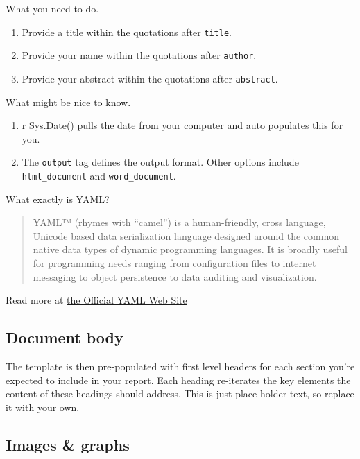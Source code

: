 \documentclass[
]{book}
\providecommand{\tightlist}{%
  \setlength{\itemsep}{0pt}\setlength{\parskip}{0pt}}
\begin{document}
What you need to do.

\begin{enumerate}
\def\labelenumi{\arabic{enumi}.}
\tightlist
\item
  Provide a title within the quotations after \texttt{title}.
\item
  Provide your name within the quotations after \texttt{author}.
\item
  Provide your abstract within the quotations after \texttt{abstract}.
\end{enumerate}

What might be nice to know.

\begin{enumerate}
\def\labelenumi{\arabic{enumi}.}
\tightlist
\item
  r Sys.Date() pulls the date from your computer and auto populates this for you.
\item
  The \texttt{output} tag defines the output format. Other options include \texttt{html\_document} and \texttt{word\_document}.
\end{enumerate}

What exactly is YAML?

\begin{quote}
YAML™ (rhymes with ``camel'') is a human-friendly, cross language, Unicode based data serialization language designed around the common native data types of dynamic programming languages. It is broadly useful for programming needs ranging from configuration files to internet messaging to object persistence to data auditing and visualization.
\end{quote}

Read more at \href{https://yaml.org/}{the Official YAML Web Site}

\hypertarget{document-body}{%
\subsection*{Document body}\label{document-body}}

The template is then pre-populated with first level headers for each section you're expected to include in your report. Each heading re-iterates the key elements the content of these headings should address. This is just place holder text, so replace it with your own.

\hypertarget{images-graphs}{%
\subsection*{Images \& graphs}\label{images-graphs}}
\end{document}
